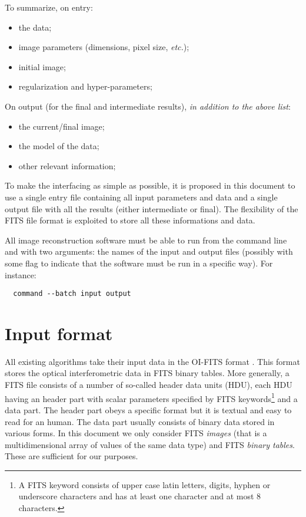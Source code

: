 \documentclass{article}
\begin{document}


To summarize, on entry:
\begin{itemize}
\item the data;
\item image parameters (dimensions, pixel size, \emph{etc.});
\item initial image;
\item regularization and hyper-parameters;
\end{itemize}
On output (for the final and intermediate results), \emph{in addition
  to the above list}:
\begin{itemize}
\item the current/final image;
\item the model of the data;
\item other relevant information;
\end{itemize}


To make the interfacing as simple as possible, it is proposed in this
document to use a single entry file containing all input parameters
and data and a single output file with all the results (either
intermediate or final).  The flexibility of the FITS file format is
exploited to store all these informations and data.

All image reconstruction software must be able to run from the command line
and with two arguments: the names of the input and output files (possibly with
some flag to indicate that the software must be run in a specific way).   For
instance:
\begin{verbatim}
  command --batch input output
\end{verbatim}


\section{Input format}

All existing algorithms take their input data in the OI-FITS format
\citep{Pauls_et_al-2005-oifits}.  This format stores the optical
interferometric data in FITS binary tables.  More generally, a FITS file
\citep{Pence_et_al-2010-FITS} consists of a number of so-called header data
units (HDU), each HDU having an header part with scalar parameters
specified by FITS keywords\footnote{A FITS keyword consists of upper case
  latin letters, digits, hyphen or underscore characters and has at least
  one character and at most 8 characters.} and a data part.  The
header part obeys a specific format but it is textual and easy to read for
an human.  The data part usually consists of binary data stored in various
forms.  In this document we only consider FITS \emph{images} (that is a
multidimensional array of values of the same data type) and FITS
\emph{binary tables}.  These are sufficient for our purposes.
\end{document}
